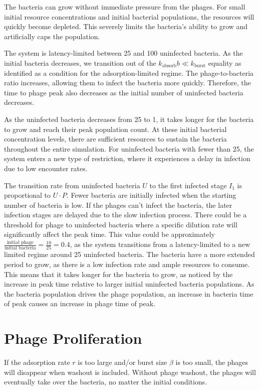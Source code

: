 The bacteria can grow without immediate pressure from the phages. 
For small initial resource concentrations and initial bacterial populations, the resources will quickly become depleted. 
This severely limits the bacteria's ability to grow and artificially caps the population. 

The system is latency-limited between 25 and 100 uninfected bacteria. 
As the initial bacteria decreases, we transition out of the $k_{\text{absorb}}b \ll k_{\text{burst}}$ equality as identified as a condition for the adsorption-limited regime. 
The phage-to-bacteria ratio increases, allowing them to infect the bacteria more quickly. 
Therefore, the time to phage peak also decreases as the initial number of uninfected bacteria decreases. 

As the uninfected bacteria decreases from 25 to 1, it takes longer for the bacteria to grow and reach their peak population count. 
At these initial bacterial concentration levels, there are sufficient resources to sustain the bacteria throughout the entire simulation. 
For uninfected bacteria with fewer than 25, the system enters a new type of restriction, where it experiences a delay in infection due to low encounter rates. 

The transition rate from uninfected bacteria $U$ to the first infected stage $I_1$ is proportional to $U\cdot P$. 
Fewer bacteria are initially infected when the starting number of bacteria is low. 
If the phages can't infect the bacteria, the later infection stages are delayed due to the slow infection process. 
There could be a threshold for phage to uninfected bacteria where a specific dilution rate will significantly affect the peak time. 
This value could be approximately $\frac{\text{initial phage}}{\text{initial bacteria}} = \frac{10}{25} = 0.4$, as the system transitions from a latency-limited to a new limited regime around 25 uninfected bacteria. 
The bacteria have a more extended period to grow, as there is a low infection rate and ample resources to consume. 
This means that it takes longer for the bacteria to grow, as noticed by the increase in peak time relative to larger initial uninfected bacteria populations. 
As the bacteria population drives the phage population, an increase in bacteria time of peak causes an increase in phage time of peak. 

\section{Phage Proliferation}
If the adsorption rate $r$ is too large and/or burst size $\beta$ is too small, the phages will disappear when washout is included. 
Without phage washout, the phages will eventually take over the bacteria, no matter the initial conditions. 


